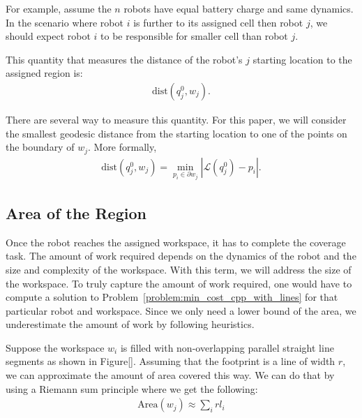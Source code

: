 \documentclass[../main.tex]{subfiles}
\begin{document}
For example, assume the $n$ robots have equal battery charge and same dynamics. In the scenario where robot $i$ is further to its assigned cell then robot $j$, we should expect robot $i$ to be responsible for smaller cell than robot $j$.

This quantity that measures the distance of the robot's $j$ starting location to the assigned region is:
\begin{equation}
\begin{aligned}
	\text{dist}(q^0_j,w_j).
\end{aligned}
\end{equation}

There are several way to measure this quantity. For this paper, we will consider the smallest geodesic distance from the starting location to one of the points on the boundary of $w_j$. More formally,
\begin{equation}
\begin{aligned}
	\text{dist}(q^0_j,w_j)=\min_{p_i\in\partial w_j}|\mathcal{L}(q^0_j)-p_i|.
\end{aligned}
\end{equation}


\subsection{Area of the Region}

Once the robot reaches the assigned workspace, it has to complete the coverage task. The amount of work required depends on the dynamics of the robot and the size and complexity of the workspace. With this term, we will address the size of the workspace. To truly capture the amount of work required, one would have to compute a solution to Problem~\ref{problem:min_cost_cpp_with_lines} for that particular robot and workspace. Since we only need a lower bound of the area, we underestimate the amount of work by following heuristics. 

Suppose the workspace $w_i$ is filled with non-overlapping parallel straight line segments as shown in Figure[]. Assuming that the footprint is a line of width $r$, we can approximate the amount of area covered this way. We can do that by using a Riemann sum principle where we get the following:
\begin{equation}
\begin{aligned}
		\text{Area}(w_j)\approx\sum_{i}rl_i
\end{aligned}
\end{equation}
\end{document}
